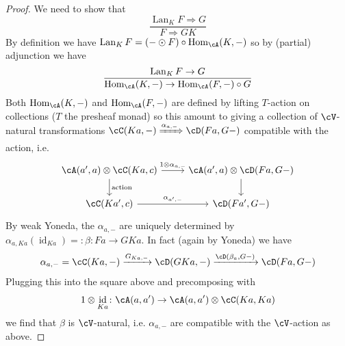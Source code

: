 \documentclass[a4paper,11pt,oneside,openany]{scrbook}
\newcommand{\from}{\colon}
\DeclareMathOperator{\Hom}{\text{Hom}}
\DeclareMathOperator{\id}{id}
\DeclareMathOperator{\Lan}{Lan}
\theoremstyle{definition}
\theoremstyle{definition}
\begin{document}
\begin{proof}
    We need to show that
    \begin{displaymath}
	\frac{\Lan_K F \Rightarrow G}{F \Rightarrow GK}
    \end{displaymath}
    By definition we have $ \Lan_K F = (- \odot F) \circ \Hom_\cA(K,-) $ so by (partial) adjunction we have
    \begin{displaymath}
	\frac{\Lan_K F \to G}{\Hom_\cA(K,-) \to \Hom_\cA(F,-)\circ G}
    \end{displaymath}
    Both $ \Hom_\cA(K,-) $ and $ \Hom_\cA(F ,-) $ are defined by lifting $ T $-action on collections ($ T $ the presheaf monad) so this amount to giving a collection of $ \cV $-natural transformations
    $ \cC(Ka,-) \xRightarrow{\alpha_{a,-}} \cD(Fa,G-) $ compatible with the action, i.e.
    \begin{displaymath}
        \begin{tikzcd}
	    {\cA(a',a) \otimes \cC(Ka,c)}
	    \arrow[r, "1\otimes \alpha_{a,-}"]
	    \arrow[d,"\text{action}"] 
	    & {\cA(a',a)} \otimes \cD(Fa,G-) \arrow[d]\\
	    {\cC(Ka',c)} \arrow[r, "{\alpha_{a',-}}"] &{\cD(Fa',G-)}
        \end{tikzcd}
    \end{displaymath}
    By weak Yoneda, the $ \alpha_{a,-} $ are uniquely determined by $ \alpha_{a,Ka}(\id_{Ka}) =: \beta \from Fa \to GKa $.
    In fact (again by Yoneda) we have
    \begin{displaymath}
	\alpha_{a,-} = \cC(Ka,-) \xrightarrow{G_{Ka,-}} \cD(GKa,-) \xrightarrow{\cD(\beta_a, G-)} \cD(Fa, G-)
    \end{displaymath}
    Plugging this into the square above and precomposing with
    \begin{displaymath}
	1\otimes \id_{Ka} \from \cA(a,a') \to \cA(a,a')\otimes \cC(Ka,Ka)
    \end{displaymath}
    we find that $ \beta $ is $ \cV $-natural, i.e. $ \alpha_{a,-} $ are compatible with the $ \cV $-action as above.
\end{proof}
\end{document}

